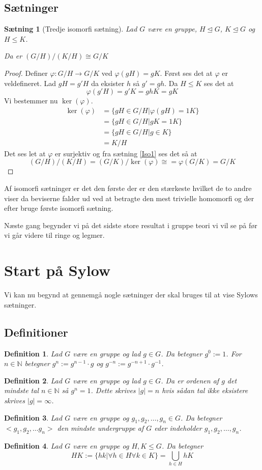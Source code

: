 \documentclass{article}
\newcommand{\N}{\mathbb{N}}
\newcommand{\inv}{^{-1}}
\newcommand{\too}{\rightarrow}
\newtheorem{setn}{Sætning}
\newtheorem{defi}{Definition}
\begin{document}
		\subsection*{Sætninger}
		\begin{setn}[Tredje isomorfi sætning] \label{Iso3}
			Lad $G$ være en gruppe, $H \unlhd G$, $K \unlhd G$ og $H \le K$.

			Da er $(G/H)/(K/H) \cong G/K$
		\end{setn}
		\begin{proof}
			Definer $\varphi: G/H \too G/K$ ved $\varphi(gH) = gK$. Først ses
			det at $\varphi$ er veldefineret. Lad $gH = g'H$ da eksister $h$ så
			$g' = gh$. Da $H \le K$ ses det at
			$$\varphi(g'H) = g'K = ghK = gK$$
			Vi bestemmer nu $\ker(\varphi)$.
			\begin{align*}
				\ker(\varphi) &= \{gH \in G/H| \varphi(gH) = 1K\} \\
				&= \{gH \in G/H| gK = 1K\} \\
				&= \{gH \in G/H| g \in K\} \\
				&= K/H
			\end{align*}
			Det ses let at $\varphi$ er surjektiv og fra sætning \ref{Iso1} ses det så at
			$$(G/H)/(K/H) = (G/K)/\ker(\varphi) \cong = \varphi(G/K) = G/K$$
		\end{proof}
		Af isomorfi sætninger er det den første der er den stærkeste hvilket de to andre viser
		da beviserne falder ud ved at betragte den mest trivielle homomorfi og der efter bruge
		første isomorfi sætning.

		Næste gang begynder vi på det sidste store resultat i gruppe teori vi vil se på før vi
		går videre til ringe og legmer.
	\newpage
	\section*{Start på Sylow}
		Vi kan nu begynd at gennemgå nogle sætninger der skal bruges til at vise
		Sylows sætninger.
		\subsection*{Definitioner}
		\begin{defi}
			Lad $G$ være en gruppe og lad $g \in G$.
			Da betegner $g^0 :=1$.
			For $n \in \N$ betegner $g^n := g^{n-1}\cdot g$ og $g^{-n} := g^{-n+1}\cdot g\inv$.
		\end{defi}
		\begin{defi}
			Lad $G$ være en gruppe og lad $g \in G$.
			Da er ordenen af $g$ det mindste tal $n \in \N$ så $g^n = 1$.
			Dette skrives $|g| = n$ hvis sådan tal ikke eksistere skrives $|g| = \infty$.
		\end{defi}
		\begin{defi}
			Lad $G$ være en gruppe og $g_1, g_2, \dots, g_n \in G$. Da betegner
			$<g_1,g_2,\dots g_n>$ den mindste undergruppe af $G$ eder indeholder
			$g_1, g_2, \dots, g_n$.
		\end{defi}
		\begin{defi}
			Lad $G$ være en gruppe og $H,K \le G$. Da betegner
			$$HK := \{hk | \forall h \in H \forall k \in K\} = \bigcup_{h\in H} hK$$
		\end{defi}
\end{document}
